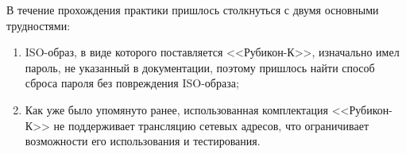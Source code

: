 В течение прохождения практики пришлось столкнуться с двумя основными трудностями:
\begin{enumerate}
	\item ISO-образ, в виде которого поставляется <<Рубикон-К>>, изначально имел пароль, не указанный в документации, поэтому пришлось найти способ сброса пароля без повреждения ISO-образа;
	
	\item Как уже было упомянуто ранее, использованная комплектация <<Рубикон-К>> не поддерживает трансляцию сетевых адресов, что ограничивает возможности его использования и тестирования.
\end{enumerate}

\printbibliography[heading=bibintoc, title={Список использованных источников}]
